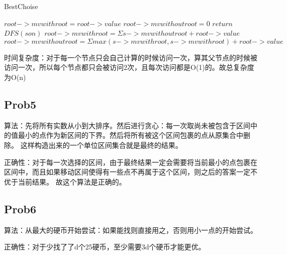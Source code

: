 \documentclass{ctexart}
\begin{document}
\begin{algorithm}
    \caption{BestChoise}
    \begin{algorithmic}
                \State $root->mvwithroot=root->value$
                \State $root->mvwithoutroot=0$
                \State $return$
            \EndIf
                \State $DFS(son)$
            \EndFor
            \State $root->mvwithroot=\Sigma s->mvwithoutroot+root->value$
            \State $root->mvwithoutroot=\Sigma max(s->mvwithroot,s->mvwithroot)+root->value$
        \EndProcedure
    \end{algorithmic}
\end{algorithm}

时间复杂度：对于每一个节点只会自己计算的时候访问一次，算其父节点的时候被访问一次，所以每个节点都只会被访问2次，且每次访问都是O(1)的。故总复杂度为O(n)

\subsection{Prob5}
算法：先将所有实数从小到大排序。然后进行贪心：每一次取尚未被包含于区间中的值最小的点作为新区间的下界。然后将所有被这个区间包裹的点从原集合中删除。
这样构造出来的一个单位区间集合就是最终的结果。

正确性：对于每一次选择的区间，由于最终结果一定会需要将当前最小的点包裹在区间中，而且如果移动区间使得有一些点不再属于这个区间，则之后的答案一定不优于当前结果。
故这个算法是正确的。

\subsection{Prob6}
算法：从最大的硬币开始尝试：如果能找则直接用之，否则用小一点的开始尝试。

正确性：对于少找了了d个25硬币，至少需要3d个硬币才能更优。
\end{document}
